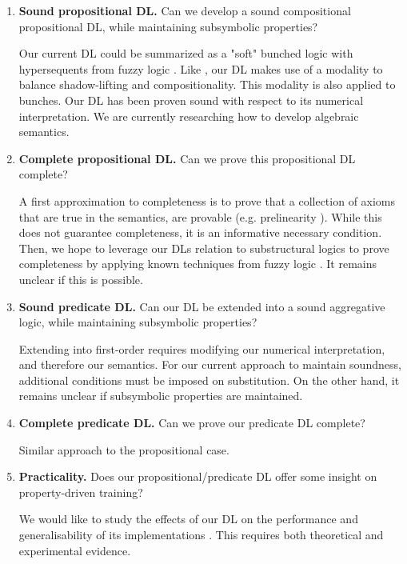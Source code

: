 \begin{enumerate}
    \item \textbf{Sound propositional DL.} Can we develop a sound compositional propositional DL, while maintaining subsymbolic properties? 
    
    Our current DL could be summarized as a "soft" bunched logic \mcita{} with hypersequents from fuzzy logic \mcita{}. Like \mcita{}, our DL makes use of a modality to balance shadow-lifting and compositionality. This modality is also applied to bunches. Our DL has been proven sound with respect to its numerical interpretation. We are currently researching how to develop algebraic semantics.
    
    \item \textbf{Complete propositional DL.} Can we prove this propositional DL complete?
    
    A first approximation to completeness is to prove that a collection of axioms that are true in the semantics, are provable (e.g. prelinearity \mcita{}). While this does not guarantee completeness, it is an informative necessary condition. Then, we hope to leverage our DLs relation to substructural logics to prove completeness by applying known techniques from fuzzy logic \mcita{}. It remains unclear if this is possible. 
    \item \textbf{Sound predicate DL.} Can our DL be extended into a sound aggregative logic, while maintaining subsymbolic properties?

    Extending into first-order requires modifying our numerical interpretation, and therefore our semantics. For our current approach to maintain soundness, additional conditions must be imposed on substitution. On the other hand, it remains unclear if subsymbolic properties are maintained. 
    
    \item \textbf{Complete predicate DL.} Can we prove our predicate DL complete?
    
    Similar approach to the propositional case. 
    
    \item \textbf{Practicality.} Does our propositional/predicate DL offer some insight on property-driven training?

    We would like to study the effects of our DL on the performance and generalisability of its implementations \mcita{}. This requires both theoretical and experimental evidence. 
    
\end{enumerate}
